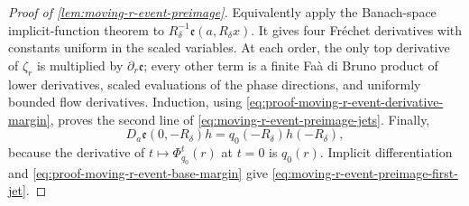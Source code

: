 \begin{proof}[Proof of \cref{lem:moving-r-event-preimage}]
Equivalently apply the Banach-space implicit-function theorem to
\(R_\delta^{-1}\mathfrak e(a,R_\delta x)\).  It gives four Fr\'{e}chet
derivatives with constants uniform in the scaled variables.
At each order, the only top derivative of \(\zeta_r\) is multiplied by
\(\partial_r\mathfrak e\); every other term is a finite Fa\`a di Bruno
product of lower derivatives, scaled evaluations of the phase directions,
and uniformly bounded flow derivatives.  Induction, using
\cref{eq:proof-moving-r-event-derivative-margin}, proves the second line of
\cref{eq:moving-r-event-preimage-jets}.  Finally,
\begin{equation}
 D_a\mathfrak e(0,-R_\delta)h
 =q_0(-R_\delta)h(-R_\delta),                   \label{eq:proof-moving-r-event-a-derivative}
\end{equation}
because the derivative of \(t\mapsto\Phi_{q_0}^t(r)\) at \(t=0\) is
\(q_0(r)\).  Implicit differentiation and
\cref{eq:proof-moving-r-event-base-margin} give
\cref{eq:moving-r-event-preimage-first-jet}.
\end{proof}

